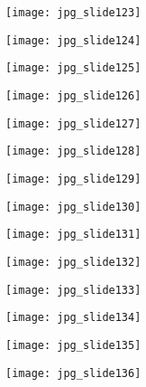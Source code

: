\documentclass[main.tex]{subfiles}
\begin{document}
\begin{center}
\texttt{[image: jpg\_slide123]}
\end{center}

\begin{center}
\texttt{[image: jpg\_slide124]}
\end{center}

\begin{center}
\texttt{[image: jpg\_slide125]}
\end{center}

\begin{center}
\texttt{[image: jpg\_slide126]}
\end{center}

\begin{center}
\texttt{[image: jpg\_slide127]}
\end{center}

\begin{center}
\texttt{[image: jpg\_slide128]}
\end{center}

\begin{center}
\texttt{[image: jpg\_slide129]}
\end{center}

\begin{center}
\texttt{[image: jpg\_slide130]}
\end{center}

\begin{center}
\texttt{[image: jpg\_slide131]}
\end{center}

\begin{center}
\texttt{[image: jpg\_slide132]}
\end{center}

\begin{center}
\texttt{[image: jpg\_slide133]}
\end{center}

\begin{center}
\texttt{[image: jpg\_slide134]}
\end{center}

\begin{center}
\texttt{[image: jpg\_slide135]}
\end{center}

\begin{center}
\texttt{[image: jpg\_slide136]}
\end{center}
\end{document}
